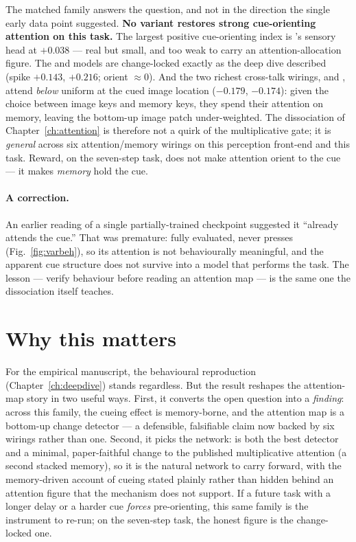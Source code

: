 The matched family answers the question, and not in the direction the single early data
point suggested. \textbf{No variant restores strong cue-orienting attention on this task.}
The largest positive cue-orienting index is 's sensory head at $+0.038$ ---
real but small, and too weak to carry an attention-allocation figure. The
 and  models are change-locked exactly as the deep dive
described (spike $+0.143$, $+0.216$; orient $\approx0$). And the two richest cross-talk
wirings,  and , attend \emph{below} uniform at the cued image
location ($-0.179$, $-0.174$): given the choice between image keys and memory keys, they
spend their attention on memory, leaving the bottom-up image patch under-weighted. The
dissociation of Chapter~\ref{ch:attention} is therefore not a quirk of the multiplicative
gate; it is \emph{general} across six attention/memory wirings on this perception front-end
and this task. Reward, on the seven-step task, does not make attention orient to the cue ---
it makes \emph{memory} hold the cue.

\paragraph{A correction.} An earlier reading of a single partially-trained 
checkpoint suggested it ``already attends the cue.'' That was premature: fully evaluated,
 never presses (Fig.~\ref{fig:varbeh}), so its attention is not behaviourally
meaningful, and the apparent cue structure does not survive into a model that performs the
task. The lesson --- verify behaviour before reading an attention map --- is the same one
the dissociation itself teaches.

\section{Why this matters}
For the empirical manuscript, the behavioural reproduction (Chapter~\ref{ch:deepdive})
stands regardless. But the result reshapes the attention-map story in two useful ways.
First, it converts the open question into a \emph{finding}: across this family, the cueing
effect is memory-borne, and the attention map is a bottom-up change detector --- a
defensible, falsifiable claim now backed by six wirings rather than one. Second, it picks
the network:  is both the best detector and a minimal, paper-faithful change
to the published multiplicative attention (a second stacked memory), so it is the natural
network to carry forward, with the memory-driven account of cueing stated plainly rather
than hidden behind an attention figure that the mechanism does not support. If a future
task with a longer delay or a harder cue \emph{forces} pre-orienting, this same family is
the instrument to re-run; on the seven-step task, the honest figure is the change-locked
one.
